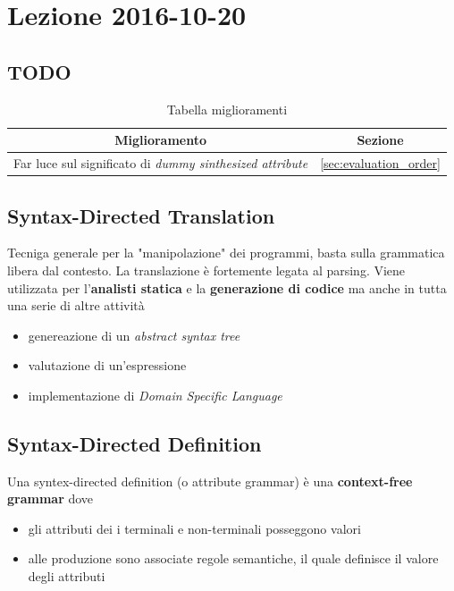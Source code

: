 \section{Lezione 2016-10-20}
\subsection{TODO}
\begin{table}[H]
\begin{center}
\begin{tabular}{|p{\textwidth}|c|}
\hline
\multicolumn{1}{|c|}{\textbf{Miglioramento}} & \textbf{Sezione} \\ \hline
Far luce sul significato di \textit{dummy sinthesized attribute} &
\ref{sec:evaluation_order} \\ \hline
\end{tabular}
\end{center}
\caption{Tabella miglioramenti}
\label{tab:tab_todo}
\end{table}

\subsection{Syntax-Directed Translation}
Tecniga generale per la "manipolazione" dei programmi, basta sulla grammatica
libera dal contesto. La translazione \`e fortemente legata al parsing. Viene
utilizzata per l'\textbf{analisti statica} e la \textbf{generazione di codice}
ma anche in tutta una serie di altre attivit\`a
\begin{itemize}
\item genereazione di un \textit{abstract syntax tree}
\item valutazione di un'espressione
\item implementazione di \textit{Domain Specific Language}
\end{itemize}

\subsection{Syntax-Directed Definition}
\begin{definition}
Una syntex-directed definition (o attribute grammar) \`e una
\textbf{context-free grammar} dove
\begin{itemize}
\item gli attributi dei i terminali e non-terminali posseggono valori
\item alle produzione sono associate regole semantiche, il quale definisce il
valore degli attributi
\end{itemize}
\end{definition}

